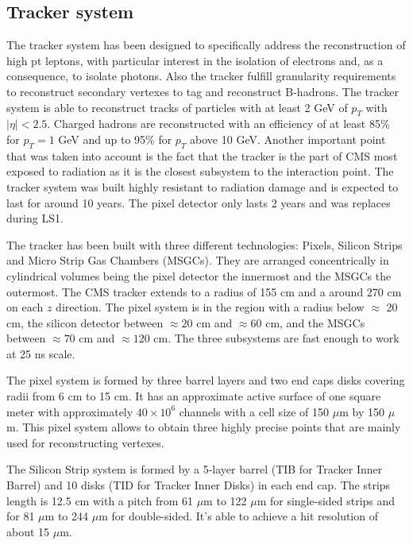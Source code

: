 \subsection{Tracker system}
\label{sec:tracker}

The tracker system has been designed to specifically address the reconstruction of high pt leptons, with particular interest in the isolation of electrons and, as a consequence, to isolate photons. Also the tracker fulfill granularity requirements to reconstruct secondary vertexes to tag and reconstruct B-hadrons. The tracker system is able to reconstruct tracks of particles with at least 2 GeV of $p_{T}$ with $|\eta|<2.5$. Charged hadrons are reconstructed with an efficiency of at least 85\% for $p_{T}=1$ GeV and up to 95\% for $p_{T}$ above 10 GeV. Another important point that was taken into account is the fact that the tracker is the part of CMS most exposed to radiation as it is the closest subsystem to the interaction point. The tracker system was built highly resistant to radiation damage and is expected to last for around 10 years. The pixel detector only lasts 2 years and was replaces during LS1. 

The tracker has been built with three different technologies: Pixels, Silicon Strips and Micro Strip Gas Chambers (MSGCs). They are arranged concentrically in cylindrical volumes being the pixel detector the innermost and the MSGCs the outermost. The CMS tracker extends to a radius of 155 cm and a around 270 cm on each $z$ direction. The pixel system is in the region with a radius below $\approx$ 20 cm, the silicon detector between $\approx 20$ cm and $\approx 60$ cm, and the MSGCs between $\approx 70$ cm and $\approx 120$ cm. The three subsystems are fast enough to work at 25 ns scale.

The pixel system is formed by three barrel layers and two end caps disks covering radii from 6 cm to 15 cm. It has an approximate active surface of one square meter with approximately $40\times10^{6}$ channels with a cell size of 150 $\mu$m by 150 $\mu$m. This pixel system allows to obtain three highly precise points that are mainly used for reconstructing vertexes.

The Silicon Strip system is formed by a 5-layer barrel (TIB for Tracker Inner Barrel) and 10 disks (TID for Tracker Inner Disks) in each end cap. The strips length is 12.5 cm with a pitch from 61 $\mu$m to 122 $\mu$m for single-sided strips and for 81 $\mu$m to 244 $\mu$m for double-sided. It's able to achieve a hit resolution of about 15 $\mu$m. 


